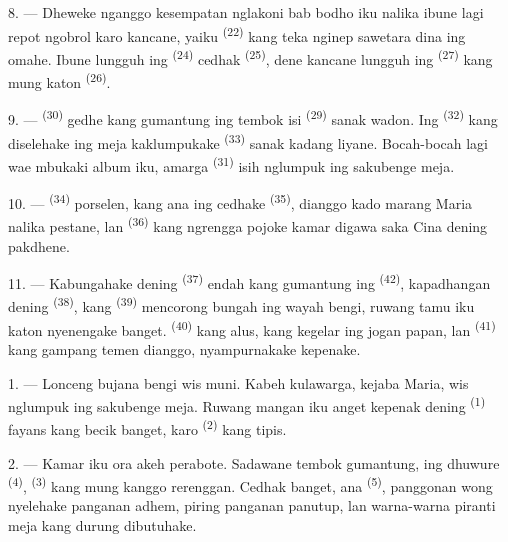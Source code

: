 8. --- Dheweke nganggo kesempatan nglakoni bab bodho iku nalika ibune
lagi repot ngobrol karo kancane, yaiku 
\textsuperscript{(22)} kang teka nginep sawetara dina ing omahe. Ibune
lungguh ing  \textsuperscript{(24)} cedhak
 \textsuperscript{(25)}, dene kancane lungguh ing
 \textsuperscript{(27)} kang mung katon
 \textsuperscript{(26)}.

9. ---  \textsuperscript{(30)} gedhe kang gumantung ing
tembok isi  \textsuperscript{(29)} sanak wadon. Ing
 \textsuperscript{(32)} kang diselehake ing meja
kaklumpukake  \textsuperscript{(33)} sanak kadang
liyane. Bocah-bocah lagi wae mbukaki album iku, amarga
 \textsuperscript{(31)} isih nglumpuk ing sakubenge
meja.

10. ---  \textsuperscript{(34)} porselen, kang ana
ing cedhake  \textsuperscript{(35)}, dianggo
kado marang Maria nalika pestane, lan 
\textsuperscript{(36)} kang ngrengga pojoke kamar digawa saka Cina
dening pakdhene.

11. --- Kabungahake dening  \textsuperscript{(37)} endah
kang gumantung ing  \textsuperscript{(42)}, kapadhangan
dening  \textsuperscript{(38)}, kang
 \textsuperscript{(39)} mencorong bungah ing
wayah bengi, ruwang tamu iku katon nyenengake banget.
 \textsuperscript{(40)} kang alus, kang kegelar ing
jogan papan, lan  \textsuperscript{(41)} kang
gampang temen dianggo, nyampurnakake kepenake.

\VUsaut{3.6mm}
\VUsaut{3.0mm}

1. --- Lonceng bujana bengi wis muni. Kabeh kulawarga, kejaba Maria,
wis nglumpuk ing sakubenge meja. Ruwang mangan iku anget kepenak
dening  \textsuperscript{(1)} fayans kang becik banget,
karo  \textsuperscript{(2)} kang tipis.

2. --- Kamar iku ora akeh perabote. Sadawane tembok gumantung, ing
dhuwure  \textsuperscript{(4)},  \textsuperscript{(3)} kang mung kanggo rerenggan. Cedhak banget,
ana  \textsuperscript{(5)}, panggonan wong
nyelehake panganan adhem, piring panganan panutup, lan warna-warna
piranti meja kang durung dibutuhake.


